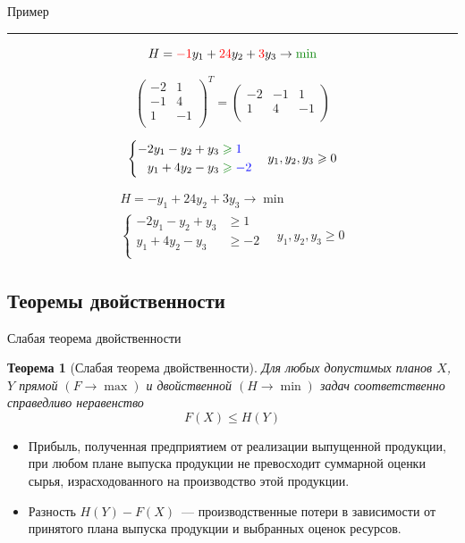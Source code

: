 \documentclass[unicode,11pt,notheorems,xcolor=table]{beamer}
\newtheorem{theorem}{Теорема}
\begin{document}
\begin{frame}[allowframebreaks]{Пример}
\medskip
\hrule
\medskip

$$
H = {\color{red}-1}y_1+{\color{red}24}y_2+{\color{red}3}y_3 \to \color{green!50!black} \min
$$


$$
\begin{pmatrix}
-2 & 1\\
-1 & 4\\
 1 & -1\\
\end{pmatrix}^T=
\begin{pmatrix}
-2 & -1 & 1\\
1 & 4 & -1\\
\end{pmatrix}
$$

$$
\left\lbrace
  \begin{aligned}
     -2y_1-y_2+y_3 & \color{green!50!black}\geqslant \color{blue} 1\\
     y_1+4y_2-y_3 & \color{green!50!black}\geqslant \color{blue} -2\\
  \end{aligned}  \right.\quad
    y_1,y_2,y_3 \geqslant 0
 $$

\framebreak
{}
$$
\begin{gathered}
H = -y_1+24y_2+3y_3 \to \min\\
\left\lbrace
  \begin{aligned}
     -2y_1-y_2+y_3 & \geqslant 1\\
     y_1+4y_2-y_3 & \geqslant -2\\
  \end{aligned}  \right.\quad
    y_1,y_2,y_3 \geqslant 0
\end{gathered}
$$

\end{frame}


\subsection{Теоремы двойственности}

\begin{frame}{Слабая теорема двойственности}{}
	\begin{theorem}[Слабая теорема двойственности]
		Для любых допустимых планов $X$,$Y$
		прямой $(F \to \max)$ и двойственной $(H \to \min)$ задач соответственно справедливо неравенство 
		$$
		F(X) \leqslant H(Y)
		$$
	\end{theorem}
	
	\begin{itemize}
	\item 
		Прибыль, полученная предприятием от реализации выпущенной продукции, при любом плане выпуска продукции не превосходит суммарной оценки сырья, израсходованного на производство этой продукции. 
	\item 
		Разность $H(Y)-F(X)$~--- производственные потери в зависимости от принятого плана выпуска продукции и выбранных оценок ресурсов.
	\end{itemize}

	
\end{frame}	
\end{document}
